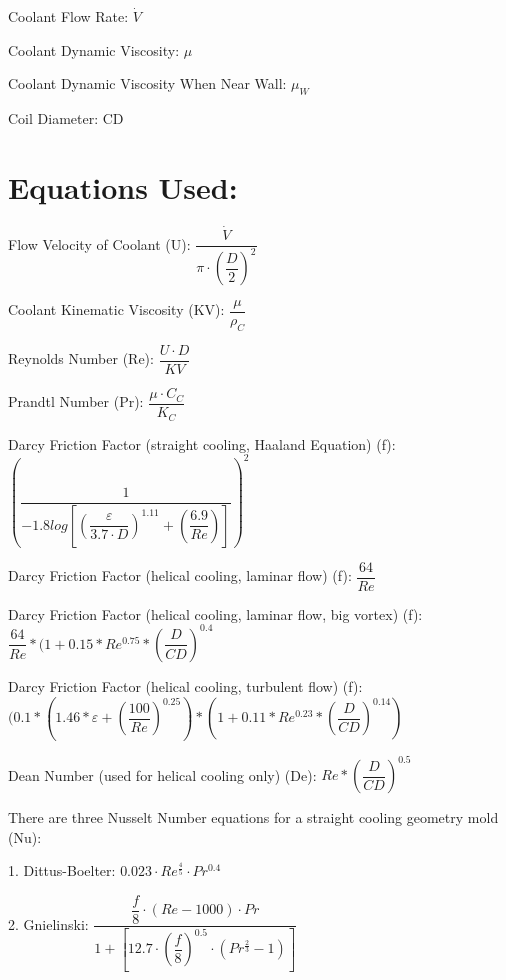 \documentclass[a4paper,12pt]{article}
\begin{document}
Coolant Flow Rate: $\dot{V}$

Coolant Dynamic Viscosity: $\mu$

Coolant Dynamic Viscosity When Near Wall: $\mu_{W}$

Coil Diameter: CD

\clearpage

\section*{Equations Used:}

\medskip

Flow Velocity of Coolant (U): $\dfrac{\dot{V}}{\pi \cdot (\dfrac{D}{2})^{2}}$

\medskip

Coolant Kinematic Viscosity (KV): $\dfrac{\mu}{\rho_{C}}$

\medskip

Reynolds Number (Re): $\dfrac{U \cdot D}{KV}$

\medskip

Prandtl Number (Pr): $\dfrac{\mu \cdot C_{C}}{K_{C}}$

\medskip

Darcy Friction Factor (straight cooling, Haaland Equation) (f): $(\dfrac{1}{-1.8log[(\dfrac{\varepsilon}{3.7 \cdot D})^{1.11}+(\dfrac{6.9}{Re})]})^{2}$

\medskip

Darcy Friction Factor (helical cooling, laminar flow) (f): $\dfrac{64}{Re}$

\medskip

Darcy Friction Factor (helical cooling, laminar flow, big vortex) (f): $\dfrac{64}{Re} * (1+0.15*Re^{0.75}*(\dfrac{D}{CD})^{0.4}$

\medskip

Darcy Friction Factor (helical cooling, turbulent flow) (f): $(0.1*(1.46*\varepsilon+(\dfrac{100}{Re})^{0.25})*(1+0.11*Re^{0.23}*(\dfrac{D}{CD})^{0.14})$

\medskip

Dean Number (used for helical cooling only) (De): $Re*(\dfrac{D}{CD})^{0.5}$

\medskip

There are three Nusselt Number equations for a straight cooling geometry mold (Nu):

1. Dittus-Boelter: $0.023 \cdot Re^{\frac{4}{5}} \cdot Pr^{0.4}$

\medskip

2. Gnielinski: $\dfrac{\dfrac{f}{8} \cdot (Re-1000) \cdot Pr}{1 + [12.7 \cdot (\dfrac{f}{8})^{0.5} \cdot (Pr^{\frac{2}{3}}-1)]}$
\end{document}
